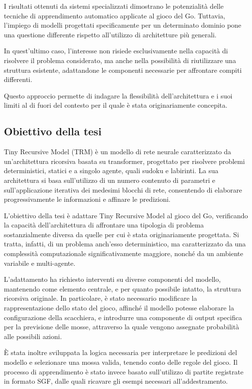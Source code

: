 I risultati ottenuti da sistemi specializzati dimostrano le potenzialità delle tecniche di apprendimento automatico applicate al gioco del Go. Tuttavia, l'impiego di modelli progettati specificamente per un determinato dominio pone una questione differente rispetto all'utilizzo di architetture più generali.

In quest'ultimo caso, l'interesse non risiede esclusivamente nella capacità di risolvere il problema considerato, ma anche nella possibilità di riutilizzare una struttura esistente, adattandone le componenti necessarie per affrontare compiti differenti.

Questo approccio permette di indagare la flessibilità dell'architettura e i suoi limiti al di fuori del contesto per il quale è stata originariamente concepita.

\subsection{Obiettivo della tesi}

Tiny Recursive Model (TRM) \cite{trm} è un modello di rete neurale caratterizzato da un'architettura ricorsiva basata su transformer, progettato per risolvere problemi deterministici, statici e a singolo agente, quali sudoku e labirinti. La sua architettura si basa sull'utilizzo di un numero contenuto di parametri e sull'applicazione iterativa dei medesimi blocchi di rete, consentendo di elaborare progressivamente le informazioni e affinare le predizioni.

L'obiettivo della tesi è adattare Tiny Recursive Model al gioco del Go, verificando la capacità dell'architettura di affrontare una tipologia di problema sostanzialmente diversa da quelle per cui è stata originariamente progettata. Si tratta, infatti, di un problema anch'esso deterministico, ma caratterizzato da una complessità computazionale significativamente maggiore, nonché da un ambiente variabile e multi-agente.

L'adattamento ha richiesto interventi su diverse componenti del modello, mantenendo come elemento centrale, e per quanto possibile intatto, la struttura ricorsiva originale. In particolare, è stato necessario modificare la rappresentazione dello stato del gioco, affinché il modello potesse elaborare la configurazione della scacchiera, e introdurre una componente di output specifica per la previsione delle mosse, attraverso la quale vengono assegnate probabilità alle possibili azioni.

È stata inoltre sviluppata la logica necessaria per interpretare le predizioni del modello e selezionare una mossa valida, tenendo conto delle regole del gioco. Il processo di apprendimento è stato invece basato sull'utilizzo di partite registrate in formato SGF, dalle quali ricavare gli esempi necessari all'addestramento.


